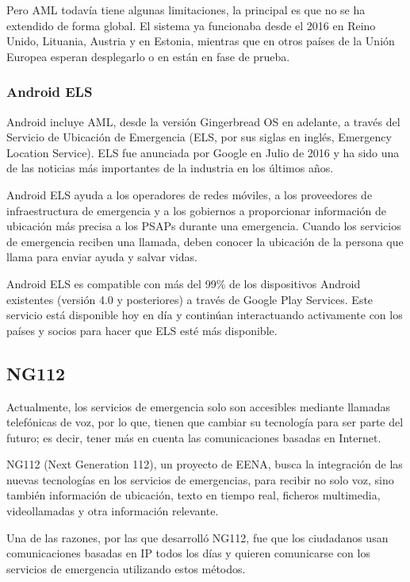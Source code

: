 Pero AML todavía tiene algunas limitaciones, la principal es que no se ha extendido de forma global. El sistema ya funcionaba desde el 2016 en Reino Unido, Lituania, Austria y en Estonia, mientras que en otros países de la Unión Europea esperan desplegarlo o en están en fase de prueba.

\subsubsection{Android ELS}

Android incluye AML, desde la versión Gingerbread OS en adelante, a través del Servicio de Ubicación de Emergencia (ELS, por sus siglas en inglés, Emergency Location Service). ELS fue anunciada por Google en Julio de 2016 y ha sido una de las noticias más importantes de la industria en los últimos años.

Android ELS ayuda a los operadores de redes móviles, a los proveedores de infraestructura de emergencia y a los gobiernos a proporcionar información de ubicación más precisa a los PSAPs durante una emergencia. Cuando los servicios de emergencia reciben una llamada, deben conocer la ubicación de la persona que llama para enviar ayuda y salvar vidas.

Android ELS es compatible con más del 99\% de los dispositivos Android existentes (versión 4.0 y posteriores) a través de Google Play Services. Este servicio está disponible hoy en día y continúan interactuando activamente con los países y socios para hacer que ELS esté más disponible.

\subsection{NG112}

Actualmente, los servicios de emergencia solo son accesibles mediante llamadas telefónicas de voz, por lo que, tienen que cambiar su tecnología para ser parte del futuro; es decir, tener más en cuenta las comunicaciones basadas en Internet.

NG112 (Next Generation 112), un proyecto de EENA, busca la integración de las nuevas tecnologías en los servicios de emergencias, para recibir no solo voz, sino también información de ubicación, texto en tiempo real, ficheros multimedia, videollamadas y otra información relevante.

Una de las razones, por las que desarrolló NG112, fue que los ciudadanos usan comunicaciones basadas en IP todos los días y quieren comunicarse con los servicios de emergencia utilizando estos métodos.


